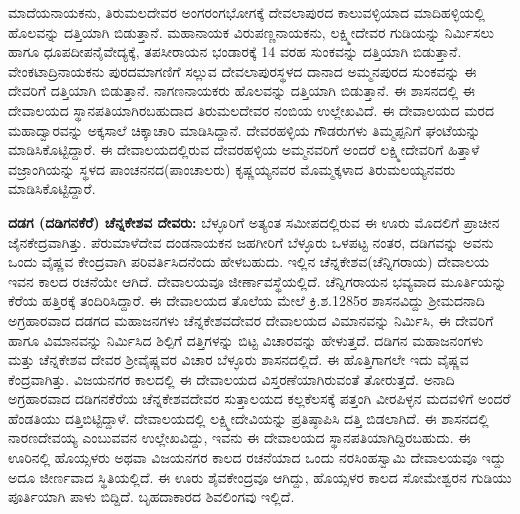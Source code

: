 ಮಾದೆಯನಾಯಕನು, ತಿರುಮಲದೇವರ ಅಂಗರಂಗಭೋಗಕ್ಕೆ ದೇವಲಾಪುರದ ಕಾಲುವಳ್ಳಿಯಾದ ಮಾದಿಹಳ್ಳಿಯಲ್ಲಿ ಹೊಲವನ್ನು ದತ್ತಿಯಾಗಿ ಬಿಡುತ್ತಾನೆ. ಮಹಾನಾಯಕ ವಿರುಪಣ್ಣನಾಯಕನು, ಲಕ್ಷ್ಮೀದೇವರ ಗುಡಿಯನ್ನು ನಿರ್ಮಿಸಲು ಹಾಗೂ ಧೂಪದೀಪನೈವೇದ್ಯಕ್ಕೆ, ತಪಸೀರಾಯನ ಭಂಡಾರಕ್ಕೆ 14 ವರಹ ಸುಂಕವನ್ನು ದತ್ತಿಯಾಗಿ ಬಿಡುತ್ತಾನೆ. ವೇಂಕಟಾದ್ರಿನಾಯಕನು ಪುರದಮಾಗಣಿಗೆ ಸಲ್ಲುವ ದೇವಲಾಪುರಸ್ಥಳದ ದಾನಾದ ಅಮ್ಮನಪುರದ ಸುಂಕವನ್ನು ಈ ದೇವರಿಗೆ ದತ್ತಿಯಾಗಿ ಬಿಡುತ್ತಾನೆ. ನಾಗಣನಾಯಕರು ಹೊಲವನ್ನು ದತ್ತಿಯಾಗಿ ಬಿಡುತ್ತಾನೆ. ಈ ಶಾಸನದಲ್ಲಿ ಈ ದೇವಾಲಯದ ಸ್ಥಾನಪತಿಯಾಗಿರಬಹುದಾದ ತಿರುಮಲದೇವರ ನಂಬಿಯ ಉಲ್ಲೇಖವಿದೆ. ಈ ದೇವಾಲಯದ ಮರದ ಮಹಾದ್ವಾರವನ್ನು ಅಕ್ಕಸಾಲೆ ಚಿಕ್ಕಾಚಾರಿ ಮಾಡಿಸಿದ್ದಾನೆ. ದೇವರಹಳ್ಳಿಯ ಗೌಡರುಗಳು ತಿಮ್ಮಪ್ಪನಿಗೆ ಘಂಟೆಯನ್ನು ಮಾಡಿಸಿಕೊಟ್ಟಿದ್ದಾರೆ. ಈ ದೇವಾಲಯದಲ್ಲಿರುವ ದೇವರಹಳ್ಳಿಯ ಅಮ್ಮನವರಿಗೆ ಅಂದರೆ ಲಕ್ಷ್ಮೀದೇವರಿಗೆ ಹಿತ್ತಾಳೆ ವಜ್ರಾಂಗಿಯನ್ನು ಸ್ಥಳದ ಪಾಂಚನನದ(ಪಾಂಚಾಲರು) ಕೃಷ್ಣಯ್ಯನವರ ಮೊಮ್ಮಕ್ಕಳಾದ ತಿರುಮಲಯ್ಯನವರು ಮಾಡಿಸಿಕೊಟ್ಟಿದ್ದಾರೆ.

\textbf{ದಡಗ (ದಡಿಗನಕೆರೆ) ಚೆನ್ನಕೇಶವ ದೇವರು:} ಬೆಳ್ಳೂರಿಗೆ ಅತ್ಯಂತ ಸಮೀಪದಲ್ಲಿರುವ ಈ ಊರು ಮೊದಲಿಗೆ ಪ್ರಾಚೀನ ಜೈನಕೇದ್ರವಾಗಿತ್ತು. ಪೆರುಮಾಳೆದೇವ ದಂಡನಾಯಕನ ಜಹಗೀರಿಗೆ ಬೆಳ್ಳೂರು ಒಳಪಟ್ಟ ನಂತರ, ದಡಿಗವನ್ನು ಅವನು ಒಂದು ವೈಷ್ಣವ ಕೇಂದ್ರವಾಗಿ ಪರಿವರ್ತಿಸಿದನೆಂದು ಹೇಳಬಹುದು. ಇಲ್ಲಿನ ಚೆನ್ನಕೇಶವ(ಚೆನ್ನಿಗರಾಯ) ದೇವಾಲಯ ಇವನ ಕಾಲದ ರಚನೆಯೇ ಆಗಿದೆ. ದೇವಾಲಯವೂ ಜೀರ್ಣಾವಸ್ಥೆಯಲ್ಲಿದೆ. ಚೆನ್ನಿಗರಾಯನ ಭವ್ಯವಾದ ಮೂರ್ತಿಯನ್ನು ಕೆರೆಯ ಹತ್ತಿರಕ್ಕೆ ತಂದಿರಿಸಿದ್ದಾರೆ. ಈ ದೇವಾಲಯದ ತೊಲೆಯ ಮೇಲೆ ಕ್ರಿ.ಶ.1285ರ ಶಾಸನವಿದ್ದು ಶ‍್ರೀಮದನಾದಿ ಅಗ್ರಹಾರವಾದ ದಡಗದ ಮಹಾಜನಗಳು ಚೆನ್ನಕೇಶವದೇವರ ದೇವಾಲಯದ ವಿಮಾನವನ್ನು ನಿರ್ಮಿಸಿ, ಈ ದೇವರಿಗೆ ಹಾಗೂ ವಿಮಾನವನ್ನು ನಿರ್ಮಿಸಿದ ಶಿಲ್ಪಿಗೆ ದತ್ತಿಗಳನ್ನು ಬಿಟ್ಟ ವಿಚಾರವನ್ನು ಹೇಳುತ್ತದೆ. ದಡಿಗನ ಮಹಾಜನಂಗಳು ಮತ್ತು ಚೆನ್ನಕೇಶವ ದೇವರ ಶ‍್ರೀವೈಷ್ಣವರ ವಿಚಾರ ಬೆಳ್ಳೂರು ಶಾಸನದಲ್ಲಿದೆ. ಈ ಹೊತ್ತಿಗಾಗಲೇ ಇದು ವೈಷ್ಣವ ಕೆಂದ್ರವಾಗಿತ್ತು. ವಿಜಯನಗರ ಕಾಲದಲ್ಲಿ ಈ ದೇವಾಲಯದ ವಿಸ್ತರಣೆಯಾಗಿರುವಂತೆ ತೋರುತ್ತದೆ. ಅನಾದಿ ಅಗ್ರಹಾರವಾದ ದಡಿಗನಕೆರೆಯ ಚೆನ್ನಕೇಶವದೇವರ ಸುತ್ತಾಲಯದ ಕಲ್ಲಕೆಲಸಕ್ಕೆ ಪತ್ತಂಗಿ ವೀರಪಿಳ್ಳನ ಮದವಳಿಗೆ ಅಂದರೆ ಹೆಂಡತಿಯು ದತ್ತಿಬಿಟ್ಟಿದ್ದಾಳೆ. ದೇವಾಲಯದಲ್ಲಿ ಲಕ್ಷ್ಮೀದೇವಿಯನ್ನು ಪ್ರತಿಷ್ಠಾಪಿಸಿ ದತ್ತಿ ಬಿಡಲಾಗಿದೆ. ಈ ಶಾಸನದಲ್ಲಿ ನಾರಣದೇವಯ್ಯ ಎಂಬುವವನ ಉಲ್ಲೇಖವಿದ್ದು, ಇವನು ಈ ದೇವಾಲಯದ ಸ್ಥಾನಪತಿಯಾಗಿದ್ದಿರಬಹುದು. ಈ ಊರಿನಲ್ಲಿ ಹೊಯ್ಸಳರು ಅಥವಾ ವಿಜಯನಗರ ಕಾಲದ ರಚನೆಯಾದ ಒಂದು ನರಸಿಂಹಸ್ವಾಮಿ ದೇವಾಲಯವೂ ಇದ್ದು ಅದೂ ಜೀರ್ಣವಾದ ಸ್ಥಿತಿಯಲ್ಲಿದೆ. ಈ ಊರು ಶೈವಕೇಂದ್ರವೂ ಆಗಿದ್ದು, ಹೊಯ್ಸಳರ ಕಾಲದ ಸೋಮೇಶ್ವರನ ಗುಡಿಯು ಪೂರ್ತಿಯಾಗಿ ಪಾಳು ಬಿದ್ದಿದೆ. ಬೃಹದಾಕಾರದ ಶಿವಲಿಂಗವು ಇಲ್ಲಿದೆ.

